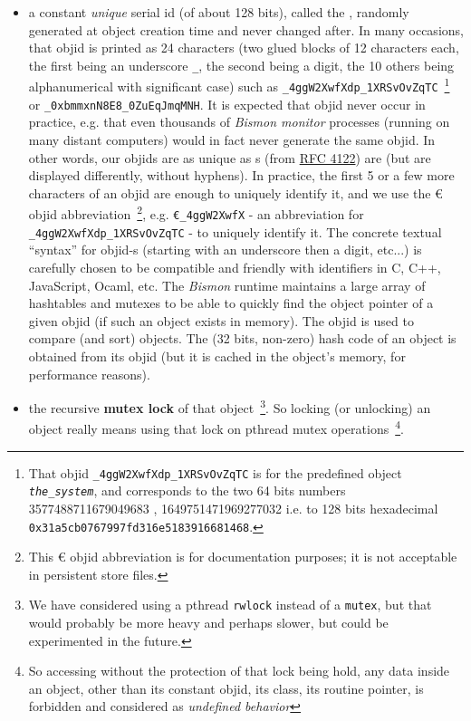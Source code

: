 \begin{itemize}
  \item a constant \emph{unique} serial id (of about 128 bits), called
    the , randomly generated at object
    creation time and never changed after. In many occasions, that
    objid is printed as 24 characters {\small (two glued blocks of 12
      characters each, the first being an underscore \texttt{\_}, the
      second being a digit, the 10 others being alphanumerical with
      significant case)} such as
    \texttt{\_4ggW2XwfXdp\_1XRSvOvZqTC}~\footnote{That objid
      \texttt{\_4ggW2XwfXdp\_1XRSvOvZqTC} is for the predefined object
      \emph{\texttt{the\_system}}, and corresponds to the two 64 bits
      numbers 3577488711679049683 {}, 1649751471969277032 i.e. to 128 bits
      hexadecimal \texttt{0x31a5cb0767997fd316e5183916681468}.}  or
    \texttt{\_0xbmmxnN8E8\_0ZuEqJmqMNH}. It is expected that objid
     never occur in practice, e.g. that
    even thousands of \emph{Bismon monitor} processes (running on many
    distant computers) would in fact never generate the same objid. In
    other words, our objids are as unique as s (from
    \href{https://tools.ietf.org/html/rfc4122}{RFC 4122}) are (but are
    displayed differently, without hyphens). In practice, the first 5
    or a few more characters of an objid are enough to uniquely
    identify it, and we use the  € objid
    abbreviation~\footnote{This € objid abbreviation is for
      documentation purposes; it is not acceptable in persistent store
      files.}, e.g. \texttt{€\_4ggW2XwfX} - an abbreviation for
    \texttt{\_4ggW2XwfXdp\_1XRSvOvZqTC} - to uniquely identify it. The
    concrete textual ``syntax'' for objid-s (starting with an
    underscore then a digit, etc...) is carefully chosen to be
    compatible and friendly with identifiers in C, C++, JavaScript,
    Ocaml, etc. The \emph{Bismon} runtime maintains a large array of
    hashtables and mutexes to be able to quickly find the object
    pointer of a given objid (if such an object exists in memory). The
    objid is used to compare (and sort) objects. The (32 bits,
    non-zero) hash code of an object is obtained from its objid (but
    it is cached in the object's memory, for performance reasons).

    \item the recursive \textbf{mutex lock} of that object~\footnote{We
      have considered using a pthread \texttt{rwlock} instead of a
      \texttt{mutex}, but that would probably be more heavy and
      perhaps slower, but could be experimented in the future.}. So
      locking (or unlocking) an object really means using that lock on
      pthread mutex operations~\footnote{So accessing without the
        protection of that lock being hold, any data inside an object,
        other than its constant objid, its class, its routine pointer,
        is forbidden and considered as \emph{undefined behavior}}.


\end{itemize}
